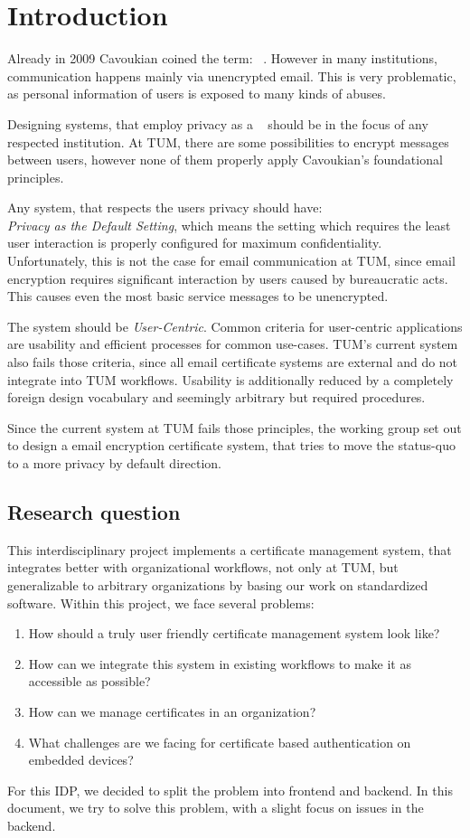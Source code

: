 \chapter{Introduction}\label{ch:introduction}
Already in 2009 Cavoukian coined the term: ~\cite{cavoukian2009privacy}.
However in many institutions, communication happens mainly via unencrypted email.
This is very problematic, as personal information of users is exposed to many kinds of abuses.

Designing systems, that employ privacy as a ~\cite{cavoukian2009privacy} should be in the focus of any respected institution.
At TUM, there are some possibilities to encrypt messages between users, however none of them properly apply Cavoukian's
foundational principles.

Any system, that respects the users privacy should have:\\
\emph{Privacy as the Default Setting}, which means the setting which requires the least user interaction is properly
configured for maximum confidentiality.
Unfortunately, this is not the case for email communication at TUM, since email encryption requires significant
interaction by users caused by bureaucratic acts.
This causes even the most basic service messages to be unencrypted.

The system should be \emph{User-Centric}.
Common criteria for user-centric applications are usability and efficient processes for common use-cases.
TUM's current system also fails those criteria, since all email certificate systems are external and do not integrate
into TUM workflows.
Usability is additionally reduced by a completely foreign design vocabulary and seemingly arbitrary but required
procedures.

Since the current system at TUM fails those principles, the working group  set out to design a email
encryption certificate system, that tries to move the status-quo to a more privacy by default direction.

\section*{Research question}
This interdisciplinary project implements a certificate management system, that integrates better with organizational
workflows, not only at TUM, but generalizable to arbitrary organizations by basing our work on standardized software.
Within this project, we face several problems:
\begin{enumerate}
    \item How should a truly user friendly certificate management system look like?
    \item How can we integrate this system in existing workflows to make it as accessible as possible?
    \item How can we manage certificates in an organization?
    \item What challenges are we facing for certificate based authentication on embedded devices?
\end{enumerate}

For this IDP, we decided to split the problem into frontend and backend.
In this document, we try to solve this problem, with a slight focus on issues in the backend.
